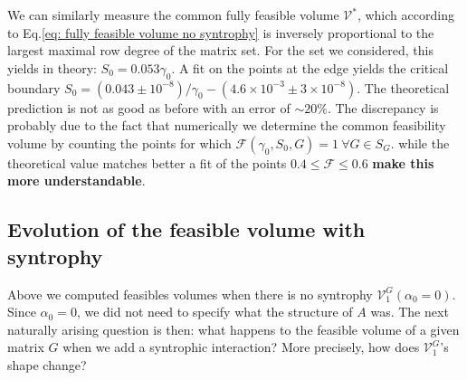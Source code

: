 \documentclass[12pt, titlepage]{report}
\begin{document}
We can similarly measure the common fully feasible volume $\mathcal{V^*}$, which according to Eq.\eqref{eq: fully feasible volume no syntrophy} is inversely proportional to the largest maximal row degree of the matrix set. For the set we considered, this yields in theory: $S_0 = 0.053 \gamma_0$. A fit on the points at the edge yields the critical boundary $S_0 = (0.043 \pm 10^{-8})/\gamma_0 - (4.6 \times 10^{-3} \pm 3 \times 10^{-8})$. The theoretical prediction is not as good as before with an error of $\sim 20 \%$. The discrepancy is probably due to the fact that numerically we determine the common feasibility volume by counting the points for which $\mathcal{F}(\gamma_0, S_0, G)=1 \ \forall G \in S_G$.
while the theoretical value matches better a fit of the points $0.4 \leq \mathcal{F} \leq 0.6$ \textbf{make this more understandable}.


\subsection{Evolution of the feasible volume with syntrophy}

Above we computed feasibles volumes when there is no syntrophy \ie $\mathcal{V}^{G}_1(\alpha_0=0)$. Since $\alpha_0=0$, we did not need to specify what the structure of $A$ was. The next naturally arising question is then: what happens to the feasible volume of a given matrix $G$ when we add a syntrophic interaction? More precisely, how does $\mathcal{V}^G_1$'s shape change?
\end{document}
